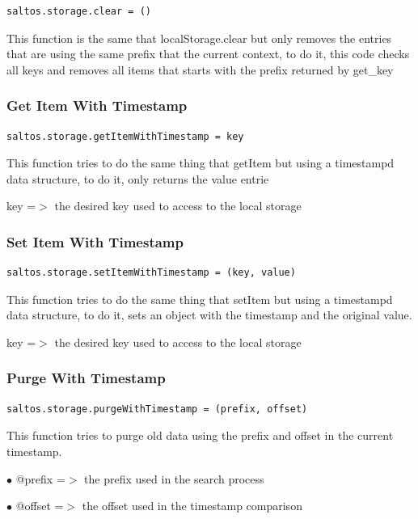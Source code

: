 \documentclass[a4paper]{article}
\begin{document}
\begin{lstlisting}
saltos.storage.clear = ()
\end{lstlisting}

This function is the same that localStorage.clear but only removes the entries that
are using the same prefix that the current context, to do it, this code checks all
keys and removes all items that starts with the prefix returned by get\_key

\hypertarget{toc296}{}
\subsubsection{Get Item With Timestamp}

\begin{lstlisting}
saltos.storage.getItemWithTimestamp = key
\end{lstlisting}

This function tries to do the same thing that getItem but using a timestampd data
structure, to do it, only returns the value entrie

key =$>$ the desired key used to access to the local storage

\hypertarget{toc297}{}
\subsubsection{Set Item With Timestamp}

\begin{lstlisting}
saltos.storage.setItemWithTimestamp = (key, value)
\end{lstlisting}

This function tries to do the same thing that setItem but using a timestampd data
structure, to do it, sets an object with the timestamp and the original value.

key =$>$ the desired key used to access to the local storage

\hypertarget{toc298}{}
\subsubsection{Purge With Timestamp}

\begin{lstlisting}
saltos.storage.purgeWithTimestamp = (prefix, offset)
\end{lstlisting}

This function tries to purge old data using the prefix and offset in the current
timestamp.

\begin{compactitem}
\item[\color{myblue}$\bullet$] @prefix =$>$ the prefix used in the search process
\item[\color{myblue}$\bullet$] @offset =$>$ the offset used in the timestamp comparison
\end{compactitem}
\end{document}
